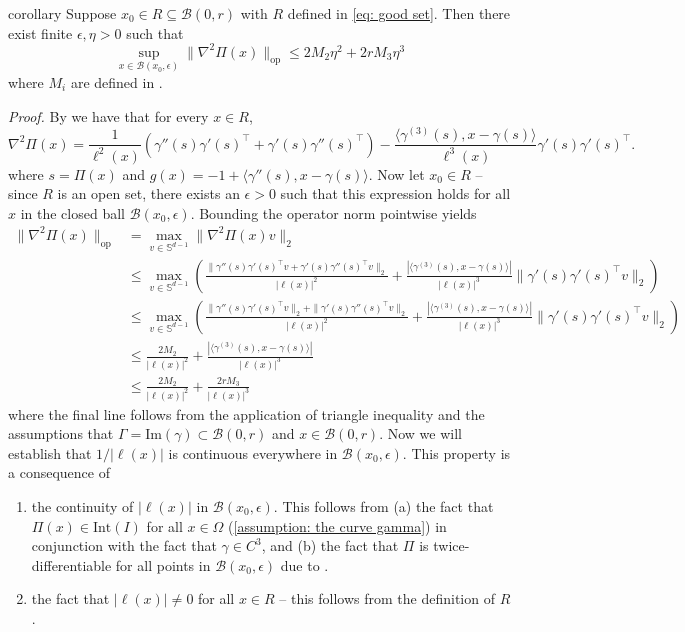 \documentclass[11pt]{article}
\begin{document}
\begin{restatable}{corollary}{} \label{lemma: operator norm bound}
    Suppose $x_0 \in R \subseteq \mathcal{B}(0, r)$ with $R$ defined in \cref{eq: good set}. Then there exist finite $\epsilon, \eta > 0$ such that 
    \[ \sup_{x\in \mathcal{B}(x_0,\epsilon)}\|\nabla^2\Pi(x)\|_{\text{op}} \leq 2M_2\eta^{2}+2rM_3\eta^{3}\]
    where $M_i$ are defined in .
\end{restatable}

\noindent \textit{Proof.} By  we have that for every $x \in R$, 
\[\nabla^2\Pi(x) = \frac{1}{\ell^2(x)}\left(\gamma''(s)\gamma'(s)^{\top} + \gamma'(s)\gamma''(s)^{\top}\right)- \frac{\langle\gamma^{(3)}(s), x - \gamma(s)\rangle}{\ell^3(x)}\gamma'(s)\gamma'(s)^{\top}.\]
where $s = \Pi(x)$ and $g(x) = -1 + \langle\gamma''(s), x-\gamma(s)\rangle$. Now let $x_0 \in R$ -- since $R$ is an open set, there exists an $\epsilon > 0$ such that this expression holds for all $x$ in the closed ball $\mathcal{B}(x_0, \epsilon)$. Bounding the operator norm pointwise yields
\begin{align*}
    \|\nabla^2\Pi(x)\|_{\text{op}} &= \max_{v\in \mathbb{S}^{d-1}} \|\nabla^2\Pi(x)v\|_2 \\
    &\leq \max_{v\in \mathbb{S}^{d-1}}\left(\frac{\|\gamma''(s)\gamma'(s)^{\top}v + \gamma'(s)\gamma''(s)^{\top}v\|_2}{|\ell(x)|^2} + \frac{|\langle\gamma^{(3)}(s), x - \gamma(s)\rangle|}{|\ell(x)|^3} \|\gamma'(s)\gamma'(s)^{\top}v\|_2\right) \\
    &\leq \max_{v\in \mathbb{S}^{d-1}}\left(\frac{\|\gamma''(s)\gamma'(s)^{\top}v\|_2 + \|\gamma'(s)\gamma''(s)^{\top}v\|_2}{|\ell(x)|^2} + \frac{|\langle\gamma^{(3)}(s), x - \gamma(s)\rangle|}{|\ell(x)|^3} \|\gamma'(s)\gamma'(s)^{\top}v\|_2\right) \\
    &\leq \frac{2M_2}{|\ell(x)|^2} + \frac{|\langle\gamma^{(3)}(s), x - \gamma(s)\rangle|}{|\ell(x)|^3} \\
    &\leq \frac{2M_2}{|\ell(x)|^2} + \frac{2r M_3}{|\ell(x)|^3}
\end{align*}
where the final line follows from the application of triangle inequality and the assumptions that $\Gamma = \text{Im}(\gamma) \subset \mathcal{B}(0, r)$ and $x \in  \mathcal{B}(0, r)$. Now we will establish that $1/|\ell(x)|$ is continuous everywhere in $\mathcal{B}(x_0,\epsilon)$. This property is a consequence of 
\begin{enumerate}
    \item the continuity of $|\ell(x)|$ in $\mathcal{B}(x_0, \epsilon)$. This follows from (a) the fact that $\Pi(x) \in \text{Int}(I)$ for all $x \in \Omega$ (\cref{assumption: the curve gamma}) in conjunction with the fact that $\gamma \in C^3$, and (b) the fact that $\Pi$ is twice-differentiable for all points in $\mathcal{B}(x_0, \epsilon)$ due to .
    \item the fact that $|\ell(x)| \neq 0$ for all $x \in R$ -- this follows from the definition of $R$.
\end{enumerate}
\end{document}
